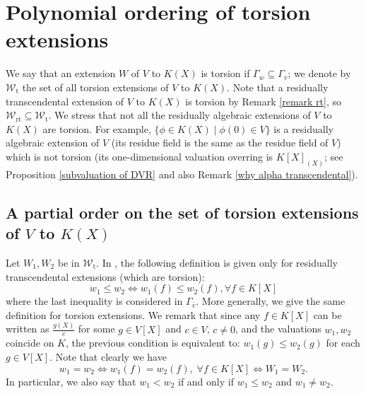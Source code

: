 \documentclass[10pt]{article}
\numberwithin{equation}{section}
\theoremstyle{definition}
\theoremstyle{definition}
\newcommand{\rt}{\text{rt}}
\renewcommand{\t}{\text{t}}
\begin{document}
\section{Polynomial ordering of torsion extensions}\label{torsion extensions}

We say that an extension $W$ of $V$ to $K(X)$ is torsion if $\Gamma_w\subseteq\Gamma_{\overline{v}}$; we denote by $\mathcal W_{\t}$  the set of all torsion extensions of $V$ to $K(X)$. Note that a residually transcendental extension of $V$ to $K(X)$ is torsion by Remark \ref{remark rt},  
so $\mathcal W_{\rt} \subseteq \mathcal W_{\t}$. We stress that not all the residually algebraic extensions of $V$ to $K(X)$ are torsion. For example, $\{\phi\in K(X)\mid \phi(0)\in V\}$  is a residually algebraic extension of $V$ (its residue field is the same as the residue field of $V$) which is not torsion (its one-dimensional valuation overring is $K[X]_{(X)}$; see Proposition \ref{subvaluation of DVR} and also Remark \ref{why alpha transcendental}). 

\subsection{A partial order on the set of torsion extensions of $V$ to $K(X)$}


Let $W_1,W_2$ be in $\mathcal W_{\t}$. In \cite[page 282]{APZAll}, the following definition is given only for residually transcendental extensions (which are torsion):
$$w_1\leq w_2\Leftrightarrow w_1(f)\leq w_2(f),\forall f\in K[X]$$
where the last inequality is considered in
$\Gamma_{\overline{v}}$. More generally, we give the same definition for torsion extensions. 
We remark that since any $f\in K[X]$ can be written as $\frac{g(X)}{c}$ for some $g\in V[X]$ and $c\in V$, $c\not=0$, 
and the valuations $w_1,w_2$ coincide on $K$, the previous condition is equivalent to:  $w_1(g)\leq w_2(g)$ for each $g\in V[X]$.
Note that clearly we have
$$w_1=w_2\Leftrightarrow w_1(f)=w_2(f),\;\forall f\in K[X]\Leftrightarrow W_1=W_2.$$
In particular, we also say that $w_1<w_2$ if and only if $w_1\leq w_2$ and $w_1\not=w_2$.

 
\end{document}
